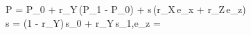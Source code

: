 P = P_0 + r_Y\,(P_1 - P_0) + s\,\left(r_X\,e_x + r_Z\,e_z\right) \\

s = (1 - r_Y)\,s_0 + r_Y\,s_1,\qquad e_z = 
